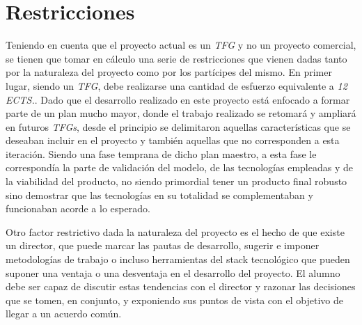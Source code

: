 \section{Restricciones} \label{phytoscheme.restricciones}
\par
Teniendo en cuenta que el proyecto actual es un \textit{TFG} y no un proyecto comercial, se tienen que tomar en cálculo una serie de restricciones que vienen dadas tanto por la naturaleza del proyecto como por los partícipes del mismo. En primer lugar, siendo un \textit{TFG}, debe realizarse una cantidad de esfuerzo equivalente a \textit{12 ECTS.}. Dado que el desarrollo realizado en este proyecto está enfocado a formar parte de un plan mucho mayor, donde el trabajo realizado se retomará y ampliará en futuros \textit{TFGs}, desde el principio se delimitaron aquellas características que se deseaban incluir en el proyecto y también aquellas que no corresponden a esta iteración.  Siendo una fase temprana de dicho plan maestro, a esta fase le correspondía la parte de validación del modelo, de las tecnologías empleadas y de la viabilidad del producto, no siendo primordial tener un producto final robusto sino demostrar que las tecnologías en su totalidad se complementaban y funcionaban acorde a lo esperado. 
\par
Otro factor restrictivo dada la naturaleza del proyecto es el hecho de que existe un director, que puede marcar las pautas de desarrollo, sugerir e imponer metodologías de trabajo o incluso herramientas del stack tecnológico que pueden suponer una ventaja o una desventaja en el desarrollo del proyecto. El alumno debe ser capaz de discutir estas tendencias con el director y razonar las decisiones que se tomen, en conjunto, y exponiendo sus puntos de vista con el objetivo de llegar a un acuerdo común. 




